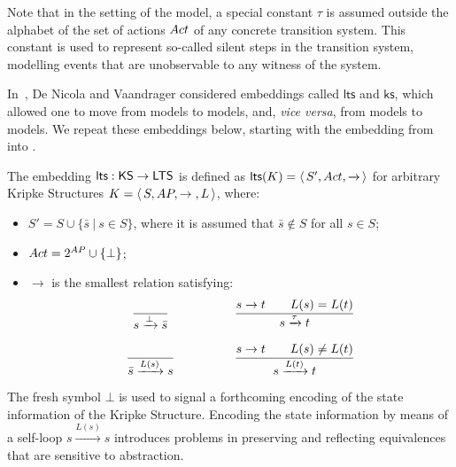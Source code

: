 \documentclass{llncs}
\newcommand{\sosrule}[2]{\frac{\raisebox{.7ex}{\normalsize{$#1$}}}
                        {\raisebox{-1.0ex}{\normalsize{$#2$}}}}
\newcommand{\ltstrans}[1]{\xrightarrow{#1}}
\newcommand{\kstrans}{\to}
\newcommand{\lts}{\mathsf{lts}}
\newcommand{\ks}{\mathsf{ks}}
\begin{document}
Note that in the setting of the \LTS model, a special constant $\tau$
is assumed outside the alphabet of the set of actions $Act$ of any
concrete transition system. This constant is used to represent so-called
silent steps in the transition system, modelling events that are
unobservable to any witness of the system.



In~\cite{DBLP:conf/litp/NicolaV90}, De Nicola and Vaandrager considered
embeddings called $\lts$ and $\ks$, which allowed one to move from \KS
models to \LTS models, and, \emph{vice versa}, from \LTS models to \KS
models. We repeat these embeddings below, starting with the embedding
from \KS into \LTS.

\newcommand{\shadow}[1]{\ensuremath{\bar{#1}}}
\begin{definition}
\label{translationlts}
The embedding $\lts : \KS \to \LTS$ is defined as $\lts(K) =
\tuple{S', \act, \ltstrans{}}$ for arbitrary Kripke Structures $K =
\tuple{S,\AP,\kstrans{},L}$, where:

\begin{itemize}
\item $S' = S \cup \{ \shadow{s} ~|~ s \in S \}$, where
it is assumed that $\shadow{s} \notin S$ for all $s \in S$;
\item $Act = 2^{AP} \cup \{\bot\}$;
\item $\ltstrans{}$ is the smallest relation satisfying:
$$
\begin{array}{cp{1cm}c}
\sosrule{}{s \ltstrans{\bot} \shadow{s}} & &
\sosrule{s \kstrans{} t \qquad L(s) = L(t)}{s \ltstrans{\tau} t} \\
\\
\sosrule{}{\shadow{s} \ltstrans{L(s)} s} & &
\sosrule{s \kstrans{} t \qquad L(s) \not= L(t)}{s \ltstrans{L(t)} t} \\
\end{array}
$$
\end{itemize}
\end{definition}
The fresh symbol $\bot$ is used to signal a forthcoming encoding of the state information of the Kripke Structure. Encoding the state information by means of a self-loop $s \ltstrans{L(s)} s$ introduces problems in preserving and reflecting equivalences that are sensitive to abstraction.
\end{document}
